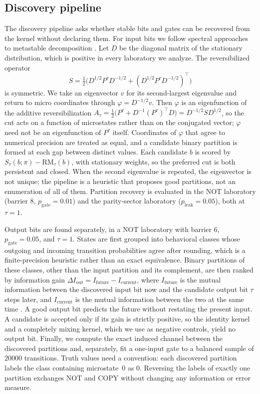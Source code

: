 \subsection{Discovery pipeline}

The discovery pipeline asks whether stable bits and gates can be recovered from the kernel without declaring them. For input bits we follow spectral approaches to metastable decomposition \cite{deuflhardweber2005pcca,shalizicrutchfield2001compmech}. Let \(D\) be the diagonal matrix of the stationary distribution, which is positive in every laboratory we analyze. The reversibilized operator
\[
S=\tfrac12\bigl(D^{1/2}P^\tau D^{-1/2}+(D^{1/2}P^\tau D^{-1/2})^{\top}\bigr)
\]
is symmetric. We take an eigenvector \(v\) for its second-largest eigenvalue and return to micro coordinates through \(\varphi = D^{-1/2}v\). Then \(\varphi\) is an eigenfunction of the additive reversibilization \(A_\tau=\tfrac12\bigl(P^\tau+D^{-1}(P^\tau)^{\top}D\bigr)=D^{-1/2}SD^{1/2}\), so the cut acts on a function of microstates rather than on the conjugated vector; \(\varphi\) need not be an eigenfunction of \(P^\tau\) itself. Coordinates of \(\varphi\) that agree to numerical precision are treated as equal, and a candidate binary partition is formed at each gap between distinct values. Each candidate \(b\) is scored by \(S_\tau(b;\pi)-\mathrm{RM}_\tau(b)\), with stationary weights, so the preferred cut is both persistent and closed. When the second eigenvalue is repeated, the eigenvector is not unique; the pipeline is a heuristic that proposes good partitions, not an enumeration of all of them. Partition recovery is evaluated in the NOT laboratory (barrier \(8\), \(p_{\mathrm{gate}}=0.01\)) and the parity-sector laboratory (\(p_{\mathrm{leak}}=0.05\)), both at \(\tau=1\).

Output bits are found separately, in a NOT laboratory with barrier \(6\), \(p_{\mathrm{gate}}=0.05\), and \(\tau=1\). States are first grouped into behavioral classes whose outgoing and incoming transition probabilities agree after rounding, which is a finite-precision heuristic rather than an exact equivalence. Binary partitions of these classes, other than the input partition and its complement, are then ranked by information gain \(\Delta I_{\mathrm{out}} = I_{\mathrm{future}}-I_{\mathrm{current}}\), where \(I_{\mathrm{future}}\) is the mutual information between the discovered input bit now and the candidate output bit \(\tau\) steps later, and \(I_{\mathrm{current}}\) is the mutual information between the two at the same time \cite{bialek2001predictability,crutchfieldyoung1989statcomplex,barnettseth2023dynamical}. A good output bit predicts the future without restating the present input. A candidate is accepted only if its gain is strictly positive, so the identity kernel and a completely mixing kernel, which we use as negative controls, yield no output bit. Finally, we compute the exact induced channel between the discovered partitions and, separately, fit a one-input gate to a balanced sample of \(20000\) transitions. Truth values need a convention: each discovered partition labels the class containing microstate~\(0\) as \(0\). Reversing the labels of exactly one partition exchanges NOT and COPY without changing any information or error measure.

